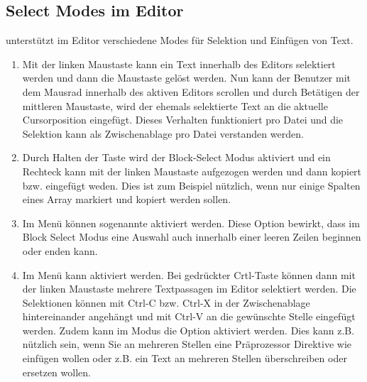 \subsection{Select Modes im Editor}

\codeblocks unterstützt im Editor verschiedene Modes für Selektion und Einfügen von Text. 

\begin{enumerate}
\item Mit der linken Maustaste kann ein Text innerhalb des Editors selektiert werden und dann die Maustaste gelöst werden. Nun kann der Benutzer mit dem Mausrad innerhalb des aktiven Editors scrollen und durch Betätigen der mittleren Maustaste, wird der ehemals selektierte Text an die aktuelle Cursorposition eingefügt. Dieses Verhalten funktioniert pro Datei und die Selektion kann als Zwischenablage pro Datei verstanden werden.
\item Durch Halten der  Taste wird der Block-Select Modus aktiviert und ein Rechteck kann mit der linken Maustaste aufgezogen werden und dann kopiert bzw. eingefügt weden. Dies ist zum Beispiel nützlich, wenn nur einige Spalten eines Array markiert und kopiert werden sollen.
 \item Im Menü  können sogenannte  aktiviert werden. Diese Option bewirkt, dass im Block Select Modus eine Auswahl auch innerhalb einer leeren Zeilen beginnen oder enden kann.
\item Im Menü   kann  aktiviert werden. Bei gedrückter Crtl-Taste können dann mit der linken Maustaste mehrere Textpassagen im Editor selektiert werden. Die Selektionen können mit Ctrl-C bzw. Ctrl-X in der Zwischenablage hintereinander angehängt und mit Ctrl-V an die gewünschte Stelle eingefügt werden. Zudem kann im  Modus die Option  aktiviert werden. Dies kann z.B. nützlich sein, wenn Sie an mehreren Stellen eine Präprozessor Direktive wie  einfügen wollen oder z.B. ein Text an mehreren Stellen überschreiben oder ersetzen wollen.
\end{enumerate}


